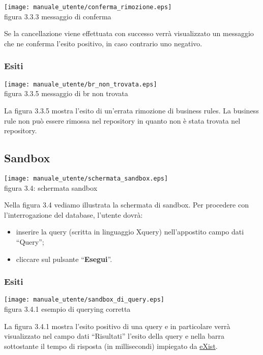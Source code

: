 \begin{center}
\texttt{[image: manuale\_utente/conferma\_rimozione.eps]}\\
 figura 3.3.3 messaggio di conferma
\end{center} 

Se la cancellazione viene effettuata con successo verr\`a visualizzato un messaggio che ne conferma l'esito positivo, in caso contrario uno negativo.
\subsubsection{Esiti}
 

\begin{center}
\texttt{[image: manuale\_utente/br\_non\_trovata.eps]}\\
 figura 3.3.5 messaggio di br non trovata
\end{center} 
La figura 3.3.5 mostra l'esito di un'errata rimozione di business rules. La business rule non pu\`o essere rimossa nel repository in quanto non \`e stata trovata nel repository.

\subsection{Sandbox}
\begin{center}
 \texttt{[image: manuale\_utente/schermata\_sandbox.eps]} \\
 figura 3.4: schermata sandbox
\end{center}
Nella figura 3.4 vediamo illustrata la schermata di sandbox. Per procedere con l'interrogazione del database, l'utente dovr\`a:
\begin{itemize}
\item inserire la query (scritta in linguaggio Xquery) nell'appostito campo dati ``Query'';
\item cliccare sul pulsante ``\textbf{Esegui}''.
\end{itemize}

\subsubsection{Esiti}
\begin{center}
\texttt{[image: manuale\_utente/sandbox\_di\_query.eps]}\\
 figura 3.4.1 esempio di querying corretta
\end{center}
La figura 3.4.1 mostra l'esito positivo di una query e in particolare verr\`a visualizzato nel campo dati ``Risultati'' l'esito della query e nella barra sottostante il tempo di risposta (in millisecondi) impiegato da \underline{eXist}. 

